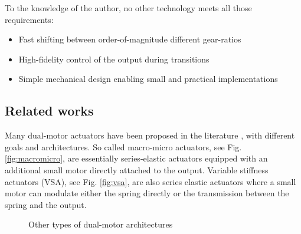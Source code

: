 To the knowledge of the author, no other technology meets all those requirements:
\begin{itemize}
	\item Fast shifting between order-of-magnitude different gear-ratios
	\item High-fidelity control of the output during transitions
	\item Simple mechanical design enabling small and practical implementations
\end{itemize}

\subsection{Related works}
Many dual-motor actuators have been proposed in the literature \cite{tagliamonte_double_2012}, with different goals and architectures. So called macro-micro actuators, see Fig. \ref{fig:macromicro}, are essentially series-elastic actuators equipped with an additional small motor directly attached to the output. Variable stiffness actuators (VSA), see Fig. \ref{fig:vsa}, are also series elastic actuators where a small motor can modulate either the spring directly or the transmission between the spring and the output.
%
\begin{figure}[htp]
        \centering
        \caption{Other types of dual-motor architectures}\label{fig:dualmotoractuators}
\end{figure}
%
